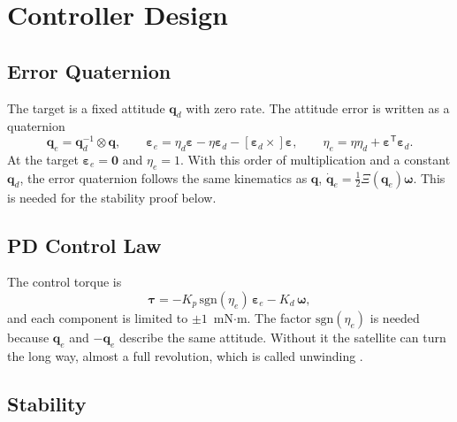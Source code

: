 \documentclass[letterpaper,10pt]{article}
\newcommand{\vv}[1]{\bm{#1}}
\newcommand{\Tp}{^{\mathsf{T}}}
\begin{document}
\section{Controller Design}

\subsection{Error Quaternion}

The target is a fixed attitude $\vv{q}_d$ with zero rate. The attitude error
is written as a quaternion
\begin{equation}
  \vv{q}_e = \vv{q}_d^{-1}\otimes\vv{q}, \qquad
  \vv{\varepsilon}_e = \eta_d\vv{\varepsilon} - \eta\vv{\varepsilon}_d - [\vv{\varepsilon}_d\times]\vv{\varepsilon}, \qquad
  \eta_e = \eta\eta_d + \vv{\varepsilon}\Tp\vv{\varepsilon}_d .
  \label{eq:qerr}
\end{equation}
At the target $\vv{\varepsilon}_e = \vv{0}$ and $\eta_e = 1$. With this order
of multiplication and a constant $\vv{q}_d$, the error quaternion follows the
same kinematics as $\vv{q}$, $\dot{\vv{q}}_e = \frac12\Xi(\vv{q}_e)\vv{\omega}$.
This is needed for the stability proof below.

\subsection{PD Control Law}

The control torque is
\begin{equation}
  \vv{\tau} = -K_p\,\mathrm{sgn}(\eta_e)\,\vv{\varepsilon}_e - K_d\,\vv{\omega},
  \label{eq:pd}
\end{equation}
and each component is limited to $\pm1$~mN$\cdot$m. The factor
$\mathrm{sgn}(\eta_e)$ is needed because $\vv{q}_e$ and $-\vv{q}_e$ describe
the same attitude. Without it the satellite can turn the long way, almost a
full revolution, which is called unwinding \cite{bhat}.

\subsection{Stability}
\end{document}
